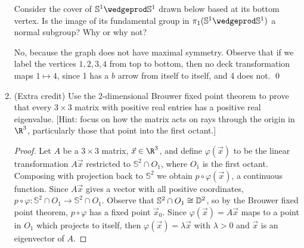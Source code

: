 \documentclass[12pt,letterpaper]{article}
\renewcommand{\phi}{\varphi}
\renewcommand{\S}{\mathbb{S}}
\begin{document}
\begin{enumerate}
Consider the cover of $\S^1\wedgeprod\S^1$ drawn below based at its bottom vertex. Is the image of its fundamental group in $ \pi_1(\S^1\wedgeprod\S^1)$ a normal subgroup? Why or why not?


\answer 
No, because the graph does not have maximal symmetry. Observe that if we label the vertices $1, 2, 3, 4$ from top to bottom, then no deck transformation maps $1\mapsto4$, since 1 has a $b$ arrow from itself to itself, and 4 does not. 
\qed

\item (Extra credit) Use the 2-dimensional Brouwer fixed point theorem to prove that every $3\times3$ matrix with positive real entries
has a positive real eigenvalue. [Hint: focus on how the matrix
acts on rays through the origin in $\R^3$, particularly those that point into the first octant.]

\begin{proof}
Let $A$ be a $3\times3$ matrix, $\vec{x}\in\R^3$, and define $\phi(\vec{x})$ to be the linear transformation $A\vec{x}$ restricted to $\S^2\cap O_1$, where $O_1$ is the first octant. Composing with projection back to $\S^2$ we obtain $p\circ \phi(\vec{x})$, a continuous function. Since $A\vec{x}$ gives a vector with all positive coordinates, $p\circ \phi:\S^2\cap O_1\to\S^2\cap O_1$. Observe that $\S^2\cap O_1\cong \D^2$, so by the Brouwer fixed point theorem, $p\circ \phi$ has a fixed point $\vec{x}_0$. Since $\phi(\vec{x})=A\vec{x}$ maps to a point in $O_1$ which projects to itself, then $\phi(\vec{x})=\lambda\vec{x}$ with $\lambda>0$ and $\vec{x}$ is an eigenvector of $A$. 
\end{proof}





\end{enumerate}
\end{document}
